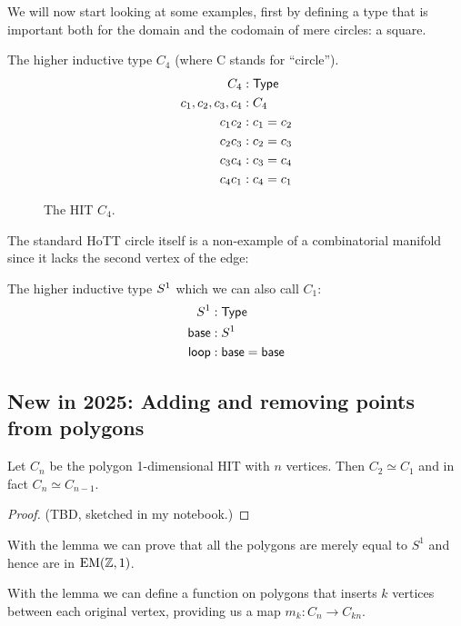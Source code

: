 We will now start looking at some examples, first by defining a type that is important both for the domain and the codomain of mere circles: a square.

\begin{mydef}
The higher inductive type \( C_4 \) (where C stands for ``circle'').
\begin{align*}
C_4 &: \mathsf{Type} \\
c_1, c_2, c_3, c_4 &: C_4 \\
c_1c_2 &: c_1 = c_2 \\
c_2c_3 &: c_2 = c_3 \\
c_3c_4 &: c_3 = c_4 \\
c_4c_1 &: c_4 = c_1 \\
\end{align*}
\end{mydef}

\begin{figure}[htbp]
\centering

\caption{The HIT \( C_4 \).}
\end{figure}

The standard HoTT circle itself is a non-example of a combinatorial manifold since it lacks the second vertex of the edge:

\begin{mydef}
The higher inductive type \( S^1 \) which we can also call \( C_1 \):
\begin{align*}
S^1 &:\mathsf{Type} \\
\mathsf{base}&:S^1 \\
\mathsf{loop}&:\mathsf{base}=\mathsf{base}
\end{align*}
\end{mydef}


\subsection{New in 2025: Adding and removing points from polygons}
\begin{mylemma}
Let \( C_n \) be the polygon 1-dimensional HIT with \( n \) vertices. Then \( C_2\simeq C_1 \) and in fact \( C_n\simeq C_{n-1} \).
\end{mylemma}
\begin{proof}
(TBD, sketched in my notebook.)
\end{proof}

With the lemma we can prove that all the polygons are merely equal to \( S^1 \) and hence are in \( \mathrm{EM}(\mathbb{Z},1) \). 

With the lemma we can define a function on polygons that inserts \( k \) vertices between each original vertex, providing us a map \( m_k:C_n\to C_{kn} \). 


